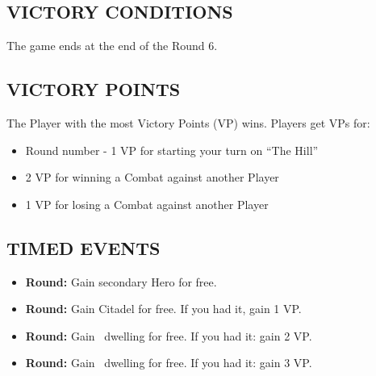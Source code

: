 \begin{multicols}{2}
\subsection*{\MakeUppercase{Victory Conditions}}
The game ends at the end of the Round 6.

\subsection*{\MakeUppercase{Victory Points}}
The Player with the most Victory Points (VP) wins. Players get
VPs for:
\begin{itemize}
  \item Round number - 1 VP for starting your turn on ``The Hill''
  \item 2 VP for winning a Combat against another Player
  \item 1 VP for losing a Combat against another Player
\end{itemize}

\subsection*{\MakeUppercase{Timed Events}}

\begin{itemize}
  \item \textbf{ Round:} Gain secondary Hero for free.
  \item \textbf{ Round:} Gain Citadel for free. If you had it, gain 1 VP.
  \item \textbf{ Round:} Gain \silver\ dwelling for free. If you had it: gain 2 VP.
  \item \textbf{ Round:} Gain \golden\ dwelling for free. If you had it: gain 3 VP.
\end{itemize}


\end{multicols}
